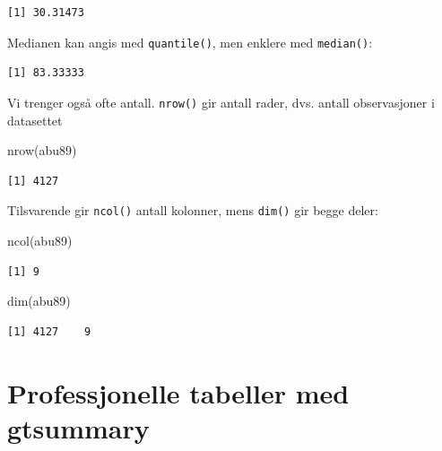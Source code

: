 \documentclass[
  norsk,
  letterpaper,
  DIV=11,
  numbers=noendperiod]{scrreprt}
\newenvironment{Shaded}{\begin{snugshade}}{\end{snugshade}}
\newcommand{\AttributeTok}[1]{\textcolor[rgb]{0.40,0.45,0.13}{#1}}
\newcommand{\ConstantTok}[1]{\textcolor[rgb]{0.56,0.35,0.01}{#1}}
\newcommand{\FunctionTok}[1]{\textcolor[rgb]{0.28,0.35,0.67}{#1}}
\newcommand{\NormalTok}[1]{\textcolor[rgb]{0.00,0.23,0.31}{#1}}
\newcommand{\SpecialCharTok}[1]{\textcolor[rgb]{0.37,0.37,0.37}{#1}}
\theoremstyle{definition}
\theoremstyle{remark}
\begin{document}
\begin{verbatim}
[1] 30.31473
\end{verbatim}

Medianen kan angis med \texttt{quantile()}, men enklere med
\texttt{median()}:

\begin{Shaded}
\end{Shaded}

\begin{verbatim}
[1] 83.33333
\end{verbatim}

Vi trenger også ofte antall. \texttt{nrow()} gir antall rader, dvs.
antall observasjoner i datasettet

\begin{Shaded}
\begin{Highlighting}[]
\FunctionTok{nrow}\NormalTok{(abu89)}
\end{Highlighting}
\end{Shaded}

\begin{verbatim}
[1] 4127
\end{verbatim}

Tilsvarende gir \texttt{ncol()} antall kolonner, mens \texttt{dim()} gir
begge deler:

\begin{Shaded}
\begin{Highlighting}[]
\FunctionTok{ncol}\NormalTok{(abu89)}
\end{Highlighting}
\end{Shaded}

\begin{verbatim}
[1] 9
\end{verbatim}

\begin{Shaded}
\begin{Highlighting}[]
\FunctionTok{dim}\NormalTok{(abu89)}
\end{Highlighting}
\end{Shaded}

\begin{verbatim}
[1] 4127    9
\end{verbatim}

\section{Professjonelle tabeller med
gtsummary}\label{professjonelle-tabeller-med-gtsummary}
\end{document}

